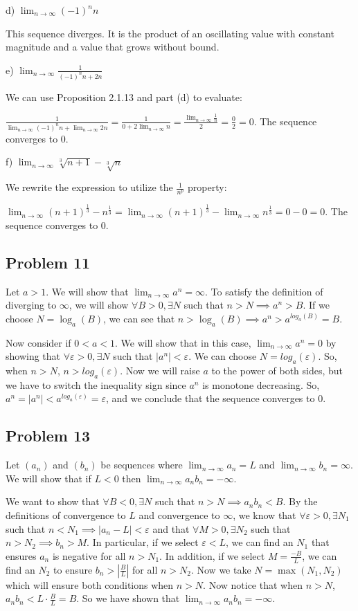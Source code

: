 \documentclass[11pt]{article}
\begin{document}
d) $\lim_{n\to\infty}(-1)^nn $

This sequence diverges. It is the product of an oscillating
value with constant magnitude and a value that grows without bound.

e) $\lim_{n\to\infty}\frac{1}{(-1)^nn+2n} $

We can use Proposition 2.1.13 and part (d) to evaluate:

$\frac{1}{\lim_{n\to\infty}(-1)^nn+\lim_{n\to\infty}2n} =
\frac{1}{0+2\lim_{n\to\infty}n} = \frac{\lim_{n\to\infty}\frac{1}{n}}{2} =
\frac{0}{2} = 0$. The sequence converges to 0.

f) $\lim_{n\to\infty}\sqrt[3]{n+1}-\sqrt[3]{n} $

We rewrite the expression to utilize the $\frac{1}{n^p}$ property:

$\lim_{n\to\infty}(n+1)^\frac{1}{3}-n^\frac{1}{3} =
\lim_{n\to\infty}(n+1)^\frac{1}{3}-\lim_{n\to\infty}n^\frac{1}{3} =
0 - 0 = 0$. The sequence converges to 0.

\subsection*{Problem 11}
Let $a>1$. We will show that $\lim_{n\to\infty}a^n=\infty$.
To satisfy the definition of diverging to $\infty$, we will show
$\forall B > 0, \exists N$ such that $n > N \implies a^n > B$. 
If we choose $N = \log_a(B)$, we can see that 
$n > \log_a(B) \implies a^n > a^{log_a(B)} = B$.

Now consider if $0<a<1$. We will show that in this case, $\lim_{n\to\infty}a^n=0$
by showing that $\forall \varepsilon > 0, \exists N$ such that
$\left| a^n \right| < \varepsilon$. We can choose $N = log_a(\varepsilon)$.
So, when $n > N$, $n > log_a(\varepsilon)$. Now we will raise $a$ to the power 
of both sides, but we have to switch the inequality sign since $a^n$ is monotone
decreasing. So, $a^n = |a^n| < a^{log_a(\varepsilon)} = \varepsilon$, and we
conclude that the sequence converges to 0.

\subsection*{Problem 13}
Let $(a_n)$ and $(b_n)$ be sequences where $\lim_{n\to\infty}a_n=L$ and 
$\lim_{n\to\infty}b_n=\infty$. We will show that if $L < 0$ then
$\lim_{n\to\infty}a_nb_n=-\infty$.

We want to show that $\forall B<0, \exists N$ such that
$n > N \implies a_nb_n < B$. 
By the definitions of convergence to $L$ and convergence to $\infty$, we know
that $\forall \varepsilon>0, \exists N_1$ such that $n<N_1 \implies 
|a_n-L|<\varepsilon$ and that $\forall M>0, \exists N_2$ such that
$n > N_2 \implies b_n > M$. In particular, if we select $\varepsilon < L$, we can
find an $N_1$ that ensures $a_n$ is negative for all $n > N_1$.
In addition, if we select $M = \frac{-B}{L}$, we can find an
$N_2$ to ensure $b_n > \left|\frac{B}{L}\right|$ for all $n > N_2$. 
Now we take $N = \max(N_1, N_2)$ which will ensure both conditions
when $n > N$. Now notice that when $n > N$, $a_nb_n < L\cdot\frac{B}{L} = B$. 
So we have shown that $\lim_{n\to\infty}a_nb_n=-\infty$.
\end{document}
